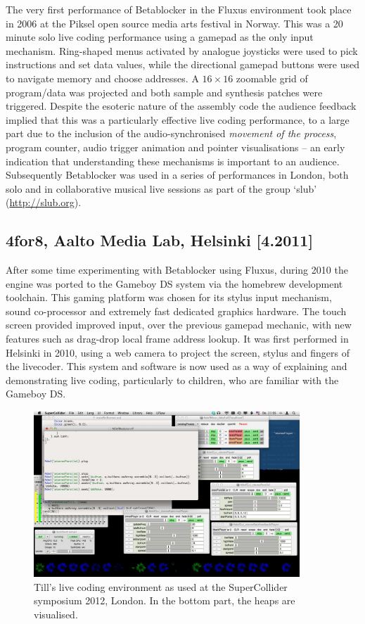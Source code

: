 \documentclass[letterpaper, 12pt]{article}
\begin{document}
The very first performance of Betablocker in the Fluxus environment took place in 2006 at the Piksel open source media arts festival in Norway. This was a 20 minute solo live coding performance using a gamepad as the only input mechanism. Ring-shaped menus activated by analogue joysticks were used to pick instructions and set data values, while the directional gamepad buttons were used to navigate memory and choose addresses. A $16\times16$ zoomable grid of program/data was projected and both sample and synthesis patches were triggered. Despite the esoteric nature of the assembly code the audience feedback implied that this was a particularly effective live coding performance, to a large part due to the inclusion of the audio-synchronised \emph{movement of the process}, program counter, audio trigger animation and pointer visualisations -- an early indication that understanding these mechanisms is important to an audience. Subsequently Betablocker was used in a series of performances in London, both solo and in collaborative musical live sessions as part of the group `slub' (\url{http://slub.org}).

\subsection{4for8, Aalto Media Lab, Helsinki [4.2011]}
\label{sub:4for8}

After some time experimenting with Betablocker using Fluxus, during 2010 the engine was ported to the Gameboy DS system via the homebrew development toolchain. This gaming platform was chosen for its stylus input mechanism, sound co-processor and extremely fast dedicated graphics hardware. The touch screen provided improved input, over the previous gamepad mechanic, with new features such as drag-drop local frame address lookup. It was first performed in Helsinki in 2010, using a web camera to project the screen, stylus and fingers of the livecoder. This system and software is now used as a way of explaining and demonstrating live coding, particularly to children, who are familiar with the Gameboy DS.
\parskip 18pt

\begin{figure}
	\centering
\includegraphics[width=10cm]{2012-SuperColliderSymposiumLiveCodingEnvironment-tills}
	\caption{Till's live coding environment as used at the SuperCollider symposium 2012, London. In the bottom part, the heaps are visualised.}
	\label{fig:fig_2012-SuperColliderSymposiumLiveCodingEnvironment-till}
\end{figure}
\end{document}
